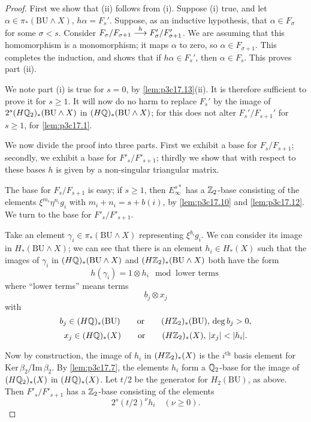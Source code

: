 \documentclass[../main]{subfiles}
\begin{document}
\begin{proof}
First we show that (ii) follows from (i). Suppose (i) true, and let $\alpha \in \pi_\ast(\mathrm{BU} \wedge X)$, $h\alpha = F_s'$. Suppose, as an inductive hypothesis, that $\alpha \in F_\sigma$ for some $\sigma < s$. Consider $F_\sigma/F_{\sigma + 1} \overset{h}{\longrightarrow} F_\sigma'/F_{\sigma + 1}'$. We are assuming that this homomorphism is a monomorphism; it maps $\alpha$ to zero, so $\alpha \in F_{\sigma + 1}$. This completes the induction, and shows that if $h \alpha \in F_s'$, then $\alpha \in F_s$. This proves part (ii).

We note part (i) is true for $s = 0$, by \ref{lem:p3c17.13}(ii). It is therefore sufficient to prove it for $s \ge 1$. It will now do no harm to replace $F_s'$ by the image of $2^s(H\mathbb{Q}_2)_\ast(\mathrm{BU} \wedge X)$ in $(H\mathbb{Q})_\ast(\mathrm {BU} \wedge X)$; for this does not alter $F_s'/F_{s + 1}'$ for $s \ge 1$, for \ref{lem:p3c17.1}.

We now divide the proof into three parts. First we exhibit a base for $F_s/F_{s + 1}$; secondly, we exhibit a base for $F'_s/F'_{s + 1}$; thirdly we show that with respect to these bases $h$ is given by a non-singular triangular matrix.

The base for $F_s/F_{s + 1}$ is easy; if $s \ge 1$, then $E_\infty^{s\ast}$ has a $\mathbb{Z}_2$-base consisting of the elements $\xi^{m_i} \eta^{n_i} g_i$ with $m_i + n_i = s + b(i)$, by \ref{lem:p3c17.10} and \ref{lem:p3c17.12}. We turn to the base for $F'_s/F'_{s + 1}$. 

Take an element $\gamma_i \in \pi_\ast(\mathrm {BU} \wedge X)$ representing $\xi^{b_i} g_i$. We can consider its image in $H_\ast(\mathrm{BU} \wedge X)$; we can see that there is an element $h_i \in H_\ast(X)$ such that the images of $\gamma_i$ in $(H \mathbb{Q})_\ast(\mathrm{BU} \wedge X)$ and $(H\mathbb{Z}_2)_\ast(\mathrm{BU} \wedge X)$ both have the form $$h(\gamma_i) = 1 \otimes h_i \mod \text{ lower terms}$$ where ``lower terms'' means terms $$b_j \otimes x_j$$ with $$b_j \in (H \mathbb{Q})_\ast(\mathrm{BU}) \qquad \text {or} \qquad (H \mathbb{Z}_2)_\ast(\mathrm{BU}), \, \deg b_j > 0,$$ $$x_j \in (H \mathbb{Q})_\ast(X) \qquad \text{or} \qquad (H \mathbb{Z}_2)_\ast(X), \, |x_j| < |h_i|.$$

Now by construction, the image of $h_i$ in $(H\mathbb{Z}_2)_\ast(X)$ is the $i^{\mathrm{th}}$ basis element for $\mathrm{Ker} \, \beta_2/\mathrm{Im} \, \beta_2$. By \ref{lem:p3c17.7}, the elements $h_i$ form a $\mathbb{Q}_2$-base for the image of $(H \mathbb{Q}_2)_\ast(X)$ in $(H\mathbb{Q})_\ast(X)$. Let $t/2$ be the generator for $H_2(\mathrm{BU})$, as above. Then $F'_s/F'_{s + 1}$ has a $\mathbb{Z}_2$-base consisting of the elements $$2^s(t/2)^\nu h_i \quad (\nu \ge 0).$$ 


\end{proof}
\end{document}
